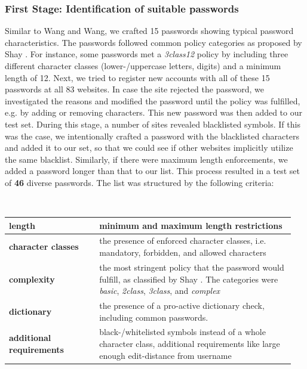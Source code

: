 \subsubsection{First Stage: Identification of suitable passwords} Similar to Wang and Wang, we crafted 15 passwords showing typical password characteristics. The passwords followed common policy categories as proposed by Shay \etal \cite{Shay2016DesigningPasswordPolicies}. For instance, some passwords met a \textit{3class12} policy by including three different character classes (lower-/uppercase letters, digits) and a minimum length of 12. Next, we tried to register new accounts with all of these 15 passwords at all 83 websites. In case the site rejected the password, we investigated the reasons and modified the password until the policy was fulfilled, e.g. by adding or removing characters. This new password was then added to our test set. During this stage, a number of sites revealed blacklisted symbols. If this was the case, we intentionally crafted a password with the blacklisted characters and added it to our set, so that we could see if other websites implicitly utilize the same blacklist. Similarly, if there were maximum length enforcements, we added a password longer than that to our list. This process resulted in a test set of \textbf{46} diverse passwords. The list was structured by the following criteria:\par
\noindent~\\
\noindent
\begin{tabular}{@{}p{0.3\linewidth}p{0.65\linewidth}@{}}
	\textbf{length} & minimum and maximum length restrictions\\\hline
	\textbf{character classes} & the presence of enforced character classes, i.e. mandatory, forbidden, and allowed characters\\\hline
	\textbf{complexity} & the most stringent policy that the password would fulfill, as classified by Shay \etal \cite{Shay2016DesigningPasswordPolicies}. The categories were \textit{basic}, \textit{2class}, \textit{3class}, and \textit{complex}\\\hline
	\textbf{dictionary} &  the presence of a pro-active dictionary check, including common passwords.\\\hline
	\textbf{additional requirements} &  black-/whitelisted symbols instead of a whole character class, additional requirements like large enough edit-distance from username
\end{tabular}

